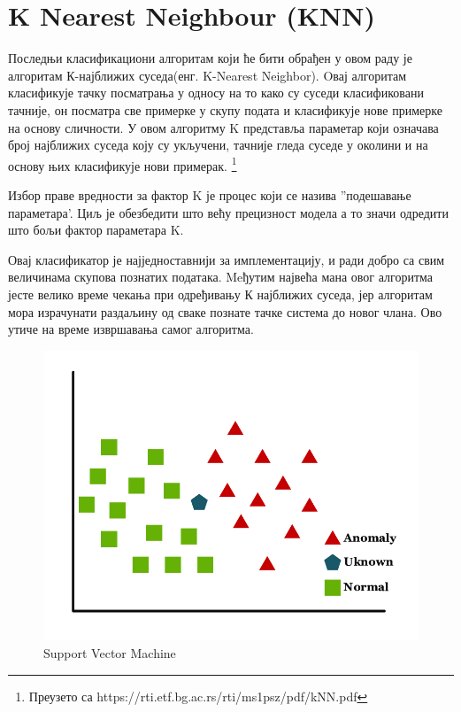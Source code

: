 \documentclass[11pt]{article} %
\begin{document}
\section{K Nearest Neighbour (KNN)}
Последњи класификациони алгоритам који ће бити обрађен у овом раду је алгоритам К-најближих суседа(енг. K-Nearest Neighbor). Oвај алгоритам класификује тачку посматрања у односу на то како су суседи класификовани
тачније, он посматра све примерке у скупу подата и класификује нове примерке на основу сличности. У овом алгоритму K представља параметар који означава број најближих суседа коју су укључени, тачније гледа суседе у околини и на основу њих класификује нови примерак. \footnote{Преузето са https://rti.etf.bg.ac.rs/rti/ms1psz/pdf/kNN.pdf}

Избор праве вредности за фактор K је процес који се назива ''подешавање параметара'. Циљ је обезбедити што већу прецизност модела а то значи одредити што бољи фактор параметара K.


Овај класификатор је најједноставнији за имплементацију, и ради добро са свим величинама скупова познатих података. Meђутим највећа мана овог алгоритма јесте велико време чекања при одређивању К најближих суседа, јер алгоритам мора израчунати раздаљину од сваке познате тачке система до новог члана. Ово утиче на време извршавања самог алгоритма.


\begin{figure}[h]

\centering
	\includegraphics[scale=0.5]{K-Nearest-Neighbor-KNN-classification-principle}
	\caption{Support Vector Machine} 
\end{figure}

\printbibliography
\end{document}
